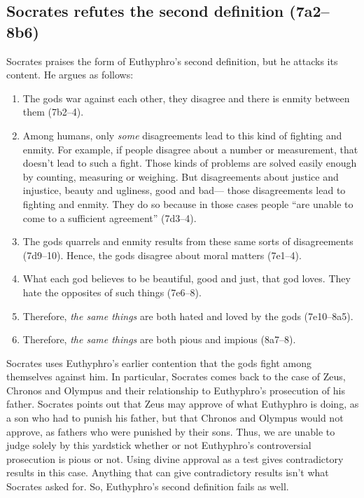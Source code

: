 \documentclass[11pt]{article}
\begin{document}
\subsection{Socrates refutes the second definition (7a2--8b6)}

Socrates praises the form of Euthyphro's second definition, but he attacks
its content.  He argues as follows:

\begin{enumerate}

    \item The gods war against each other, they disagree and there is enmity between them (7b2--4).

    \item Among humans, only \emph{some} disagreements lead to this kind of fighting and enmity.  For example, if people disagree about a number or measurement, that doesn't lead to such a fight.  Those kinds of problems are solved easily enough by counting, measuring or weighing.  But disagreements about justice and injustice, beauty and ugliness, good and bad--- those disagreements lead to fighting and enmity.  They do so because in those cases people ``are unable to come to a sufficient agreement'' (7d3--4).

    \item The gods quarrels and enmity results from these same sorts of disagreements (7d9--10).  Hence, the gods disagree about moral matters (7e1--4).

    \item What each god believes to be beautiful, good and just, that god loves.  They hate the opposites of such things (7e6--8).

    \item Therefore, \emph{the same things} are both hated and loved by the gods (7e10--8a5).

    \item Therefore, \emph{the same things} are both pious and impious (8a7--8).

\end{enumerate}


Socrates uses Euthyphro's earlier contention that the gods fight among themselves against him.  In particular, Socrates comes back to the case of Zeus, Chronos and Olympus and their relationship to Euthyphro's prosecution of his father.  Socrates points out that Zeus may approve of what Euthyphro is doing, as a son who had to punish his father, but that Chronos and Olympus would not approve, as fathers who were punished by their sons.  Thus, we are unable to judge solely by this yardstick whether or not Euthyphro's controversial prosecution is pious or not.  Using divine approval as a test gives contradictory results in this case.  Anything that can give contradictory results isn't what Socrates asked for.  So, Euthyphro's second definition fails as well.
\end{document}
